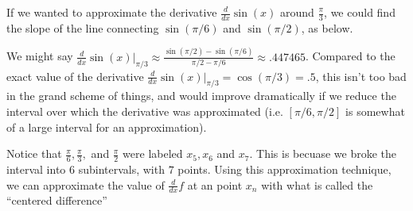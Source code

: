 \documentclass{ximera}
\begin{document}
If we wanted to approximate the derivative $\frac{d}{dx}\sin(x)$ around $\frac{\pi}{3}$, we could find the slope of the line connecting $\sin(\pi/6)$ and $\sin(\pi/2)$, as below.


We might say $\frac{d}{dx}\sin(x)|_{\pi/3}\approx \frac{\sin(\pi/2)-\sin(\pi/6)}{\pi/2-\pi/6}\approx .447465$. Compared to the exact value of the derivative $\frac{d}{dx}\sin(x)|_{\pi/3}=\cos(\pi/3)=.5$, this isn't too bad in the grand scheme of things, and would improve dramatically if we reduce the interval over which the derivative was approximated (i.e. $[\pi/6,\pi/2]$ is somewhat of a large interval for an approximation).

Notice that $\frac{\pi}{6}, \frac{\pi}{3}, $ and $\frac{\pi}{2}$ were labeled $x_5, x_6$ and $x_7$. This is becuase we broke the interval into $6$ subintervals, with $7$ points. Using this approximation technique, we can approximate the value of $\frac{d}{dx}f$ at an point $x_n$ with what is called the ``centered difference''
\end{document}
